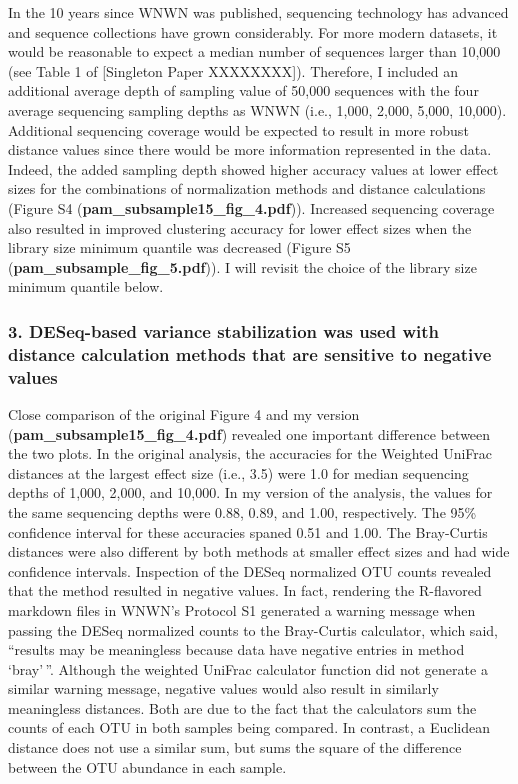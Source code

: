 \documentclass[
]{article}
\begin{document}
In the 10 years since WNWN was published, sequencing technology has
advanced and sequence collections have grown considerably. For more
modern datasets, it would be reasonable to expect a median number of
sequences larger than 10,000 (see Table 1 of {[}Singleton Paper
XXXXXXXX{]}). Therefore, I included an additional average depth of
sampling value of 50,000 sequences with the four average sequencing
sampling depths as WNWN (i.e., 1,000, 2,000, 5,000, 10,000). Additional
sequencing coverage would be expected to result in more robust distance
values since there would be more information represented in the data.
Indeed, the added sampling depth showed higher accuracy values at lower
effect sizes for the combinations of normalization methods and distance
calculations (Figure S4 (\textbf{pam\_subsample15\_fig\_4.pdf})).
Increased sequencing coverage also resulted in improved clustering
accuracy for lower effect sizes when the library size minimum quantile
was decreased (Figure S5 (\textbf{pam\_subsample\_fig\_5.pdf})). I will
revisit the choice of the library size minimum quantile below.

\hypertarget{deseq-based-variance-stabilization-was-used-with-distance-calculation-methods-that-are-sensitive-to-negative-values}{%
\subsubsection{3. DESeq-based variance stabilization was used with
distance calculation methods that are sensitive to negative
values}\label{deseq-based-variance-stabilization-was-used-with-distance-calculation-methods-that-are-sensitive-to-negative-values}}

Close comparison of the original Figure 4 and my version
(\textbf{pam\_subsample15\_fig\_4.pdf}) revealed one important
difference between the two plots. In the original analysis, the
accuracies for the Weighted UniFrac distances at the largest effect size
(i.e., 3.5) were 1.0 for median sequencing depths of 1,000, 2,000, and
10,000. In my version of the analysis, the values for the same
sequencing depths were 0.88, 0.89, and 1.00, respectively. The 95\%
confidence interval for these accuracies spaned 0.51 and 1.00. The
Bray-Curtis distances were also different by both methods at smaller
effect sizes and had wide confidence intervals. Inspection of the DESeq
normalized OTU counts revealed that the method resulted in negative
values. In fact, rendering the R-flavored markdown files in WNWN's
Protocol S1 generated a warning message when passing the DESeq
normalized counts to the Bray-Curtis calculator, which said, ``results
may be meaningless because data have negative entries in method
`bray'\,''. Although the weighted UniFrac calculator function did not
generate a similar warning message, negative values would also result in
similarly meaningless distances. Both are due to the fact that the
calculators sum the counts of each OTU in both samples being compared.
In contrast, a Euclidean distance does not use a similar sum, but sums
the square of the difference between the OTU abundance in each sample.
\end{document}
